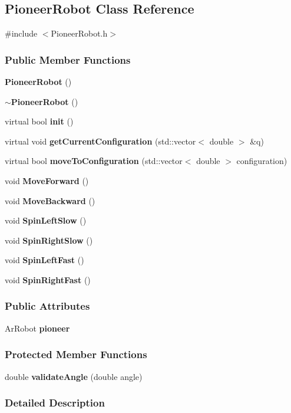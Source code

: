 \subsection{\-Pioneer\-Robot \-Class \-Reference}
\label{class_pioneer_robot}


{\ttfamily \#include $<$\-Pioneer\-Robot.\-h$>$}

\subsubsection*{\-Public \-Member \-Functions}
\begin{DoxyCompactItemize}
\item 
{\bf \-Pioneer\-Robot} ()
\item 
{\bf $\sim$\-Pioneer\-Robot} ()
\item 
virtual bool {\bf init} ()
\item 
virtual void {\bf get\-Current\-Configuration} (std\-::vector$<$ double $>$ \&q)
\item 
virtual bool {\bf move\-To\-Configuration} (std\-::vector$<$ double $>$ configuration)
\item 
void {\bf \-Move\-Forward} ()
\item 
void {\bf \-Move\-Backward} ()
\item 
void {\bf \-Spin\-Left\-Slow} ()
\item 
void {\bf \-Spin\-Right\-Slow} ()
\item 
void {\bf \-Spin\-Left\-Fast} ()
\item 
void {\bf \-Spin\-Right\-Fast} ()
\end{DoxyCompactItemize}
\subsubsection*{\-Public \-Attributes}
\begin{DoxyCompactItemize}
\item 
\-Ar\-Robot {\bf pioneer}
\end{DoxyCompactItemize}
\subsubsection*{\-Protected \-Member \-Functions}
\begin{DoxyCompactItemize}
\item 
double {\bf validate\-Angle} (double angle)
\end{DoxyCompactItemize}


\subsubsection{\-Detailed \-Description}


